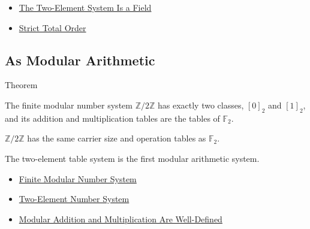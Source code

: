\begin{dependencies}
\begin{itemize}
  \item \hyperref[thm:two-element-system-is-field]{The Two-Element System Is a Field}
  \item \hyperref[def:strict-total-order]{Strict Total Order}
\end{itemize}
\end{dependencies}

\subsection*{As Modular Arithmetic}

\begin{theorembox}{Theorem}
\begin{theorem}
\label{thm:z-mod-two-is-two-element-system}
The finite modular number system \(\mathbb{Z}/2\mathbb{Z}\) has exactly two
classes, \([0]_2\) and \([1]_2\), and its addition and multiplication tables
are the tables of \(\mathbb{F}_2\).
\end{theorem}

\begin{remark*}
\(\mathbb{Z}/2\mathbb{Z}\) has the same carrier size and operation tables as
\(\mathbb{F}_2\).
\end{remark*}

\begin{remark*}[Interpretation]
The two-element table system is the first modular arithmetic system.
\end{remark*}
\end{theorembox}

\begin{dependencies}
\begin{itemize}
  \item \hyperref[def:finite-modular-number-system]{Finite Modular Number System}
  \item \hyperref[def:two-element-number-system]{Two-Element Number System}
  \item \hyperref[thm:modular-operations-well-defined]{Modular Addition and Multiplication Are Well-Defined}
\end{itemize}
\end{dependencies}

